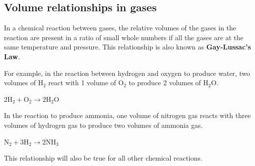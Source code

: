             \subsection{ Volume relationships in gases}
            \nopagebreak
      \label{m38711*id65179}In a chemical reaction between gases, the relative volumes of the gases in the reaction are present in a ratio of small whole numbers if all the gases are at the same temperature and pressure. This relationship is also known as \textbf{Gay-Lussac's Law}.\par 
      \label{m38711*id65189}For example, in the reaction between hydrogen and oxygen to produce water, two volumes of $\mathrm{H}{}_{2}$ react with 1 volume of $\mathrm{O}{}_{2}$ to produce 2 volumes of $\mathrm{H}{}_{2}\mathrm{O}$.\par 
      \label{m38711*id65237}$2\mathrm{H}{}_{2}+\mathrm{O}{}_{2}\to 2\mathrm{H}{}_{2}\mathrm{O}$\par 
      \label{m38711*id65282}In the reaction to produce ammonia, one volume of nitrogen gas reacts with three volumes of hydrogen gas to produce two volumes of ammonia gas.\par 
      \label{m38711*id65286}$\mathrm{N}{}_{2}+3\mathrm{H}{}_{2}\to 2\mathrm{NH}{}_{3}$
      \par 
      \label{m38711*id65329}This relationship will also be true for all other chemical reactions.\par 
    \label{m38711*cid8}
